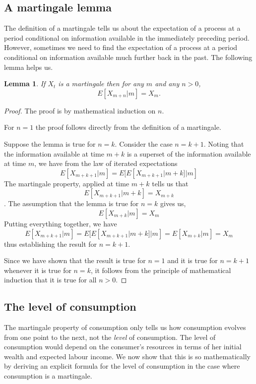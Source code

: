 \documentclass[12pt,reqno,openany]{amsbook}
\theoremstyle{plain}
\newtheorem{lem}{Lemma}[chapter]
\theoremstyle{definition}
\begin{document}
\subsection{A martingale lemma}
The definition of a martingale tells us about the expectation of a
process at a period conditional on information available in the
immediately preceding period. However, sometimes we need to find the
expectation of a process at a period conditional on information
available much further back in the past. The following lemma helps us.
\begin{lem}\label{lem:martingale-mp}
If $X_t$ is a martingale then for any $m$ and any $n>0$,
\[E[X_{m+n}|m]=X_m.\]
\end{lem}
\begin{proof}
The proof is by mathematical induction on $n$.

For $n=1$ the proof follows directly from the definition of a martingale.

Suppose the lemma is true for $n=k$. Consider the case $n=k+1$.
Noting that the information available at time $m+k$ is a superset of
the information available at time $m$, we have from the law of
iterated expectations
\[E[X_{m+k+1}|m]=E[E[X_{m+k+1}|m+k]|m]\]
The martingale property, applied at time $m+k$ tells us that
\[E[X_{m+k+1}|m+k]=X_{m+k}\]. 
The assumption that the lemma is true for $n=k$ gives us,
\[E[X_{m+k}|m]=X_m\]
Putting everything together, we have
\[E[X_{m+k+1}|m]=E[E[X_{m+k+1}|m+k]|m]=E[X_{m+k}|m]=X_m\]
thus establishing the result for $n=k+1$.

Since we have shown that the result is true for $n=1$ and it is true
for $n=k+1$ whenever it is true for $n=k$, it follows from the
principle of mathematical induction that it is true for all $n>0$.
\end{proof}


\subsection{The level of consumption}
The martingale property of consumption only tells us how consumption evolves from one
point to the next, not the \emph{level} of consumption. The level of
consumption would depend on the consumer's resources in terms of her
initial wealth and expected labour income. We now show that this is so
mathematically by deriving an explicit formula for the level of
consumption in the case where consumption is a martingale.
\end{document}
